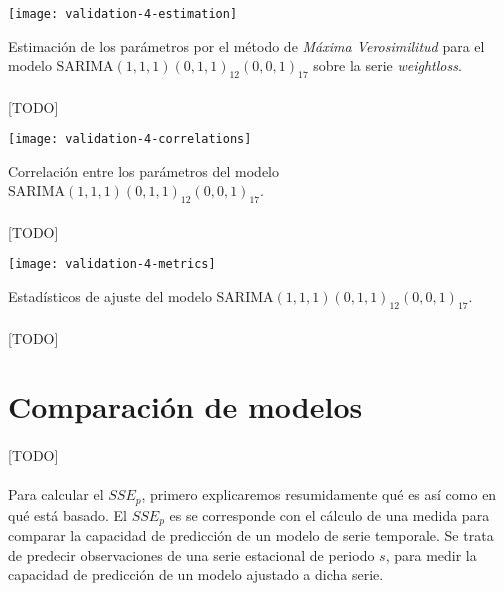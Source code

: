 \documentclass[a4paper, spanish]{article}
\begin{document}
      \begin{table}[htb!]
        \centering
        \texttt{[image: validation-4-estimation]}
        \caption{Estimación de los parámetros por el método de \emph{Máxima Verosimilitud} para el modelo $\text{SARIMA}(1, 1, 1)(0, 1, 1)_{12}(0, 0, 1)_{17}$ sobre la serie \emph{weightloss}.}
        \label{table:validation-4-estimation}
      \end{table}

      \paragraph{}
      [TODO]

      \begin{table}[htb!]
        \centering
        \texttt{[image: validation-4-correlations]}
        \caption{Correlación entre los parámetros del modelo $\text{SARIMA}(1, 1, 1)(0, 1, 1)_{12}(0, 0, 1)_{17}$.}
        \label{table:validation-4-correlations}
      \end{table}

      \paragraph{}
      [TODO]

      \begin{table}[htb!]
        \centering
        \texttt{[image: validation-4-metrics]}
        \caption{Estadísticos de ajuste del modelo $\text{SARIMA}(1, 1, 1)(0, 1, 1)_{12}(0, 0, 1)_{17}$.}
        \label{img:validation_4_metrics}
      \end{table}

      \paragraph{}
      [TODO]


  \section{Comparación de modelos}
  \label{sec:comparison}
    \paragraph{}
    [TODO]


    \paragraph{}
    Para calcular el $SSE_p$, primero explicaremos resumidamente qué es así como en qué está basado. El $SSE_p$ es se corresponde con el cálculo de una medida para comparar la capacidad de predicción de un modelo de serie temporale. Se trata de predecir observaciones de una serie estacional de periodo $s$, para medir la capacidad de predicción de un modelo ajustado a dicha serie.
\end{document}
